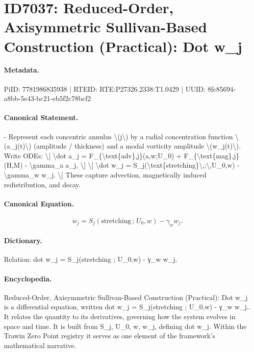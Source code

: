 \section*{ID7037: Reduced-Order, Axisymmetric Sullivan-Based Construction (Practical): Dot w\_j}
\paragraph{Metadata.}
PiID: 7781986835938 | RTEID: RTE:P27326.2338:T1.0429 | UUID: 8fc85694-a8bb-5e43-bc21-eb5f2c78bcf2

\paragraph{Canonical Statement.}
- Represent each concentric annulus \textbackslash{}(j\textbackslash{}) by a radial concentration function \textbackslash{}(a\_j(t)\textbackslash{}) (amplitude / thickness) and a modal vorticity amplitude \textbackslash{}(w\_j(t)\textbackslash{}). Write ODEs: \textbackslash{}[ \textbackslash{}dot a\_j = F\_\{\textbackslash{}text\{adv\},j\}(a,w;U\_0) + F\_\{\textbackslash{}text\{mag\},j\}(H,M) - \textbackslash{}gamma\_a a\_j, \textbackslash{}] \textbackslash{}[ \textbackslash{}dot w\_j = S\_j(\textbackslash{}text\{stretching\}\textbackslash{},;\textbackslash{},U\_0,w) - \textbackslash{}gamma\_w w\_j. \textbackslash{}] These capture advection, magnetically induced redistribution, and decay.

\paragraph{Canonical Equation.}
\[
\dot w_j = S_j(\text{stretching}\,;\,U_0,w) - \gamma_w w_j.
\]

\paragraph{Dictionary.}
Relation: dot w\_j = S\_j(stretching ; U\_0,w) - γ\_w w\_j.

\paragraph{Encyclopedia.}
Reduced-Order, Axisymmetric Sullivan-Based Construction (Practical): Dot w\_j is a differential equation, written dot w\_j = S\_j(stretching ; U\_0,w) - γ\_w w\_j.. It relates the quantity to its derivatives, governing how the system evolves in space and time. It is built from S\_j, U\_0, w, w\_j, defining dot w\_j. Within the Trawin Zero Point registry it serves as one element of the framework's mathematical narrative.
